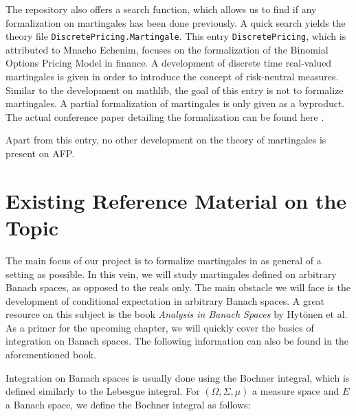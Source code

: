 The repository also offers a search function, which allows us to find if any formalization on martingales has been done previously. A quick search yields the theory file \lstinline{DiscretePricing.Martingale}. This entry \lstinline{DiscretePricing}, which is attributed to Mnacho Echenim, focuses on the formalization of the Binomial Options Pricing Model in finance. A development of discrete time real-valued martingales is given in order to introduce the concept of risk-neutral measures. Similar to the development on \textsf{mathlib}, the goal of this entry is not to formalize martingales. A partial formalization of martingales is only given as a byproduct. The actual conference paper detailing the formalization can be found here \cite{EchenimPeltier}.

Apart from this entry, no other development on the theory of martingales is present on \textsf{\ac{AFP}}.
\pagebreak

\section{Existing Reference Material on the Topic}

The main focus of our project is to formalize martingales in as general of a setting as possible. In this vein, we will study martingales defined on arbitrary Banach spaces, as opposed to the reals only. The main obstacle we will face is the development of conditional expectation in arbitrary Banach spaces. A great resource on this subject is the book \textit{Analysis in Banach Spaces} \cite{Hytoenen_2016} by Hytönen et al. As a primer for the upcoming chapter, we will quickly cover the basics of integration on Banach spaces. The following information can also be found in the aforementioned book.

Integration on Banach spaces is usually done using the Bochner integral, which is defined similarly to the Lebesgue integral. For $(\Omega, \Sigma, \mu)$ a measure space and $E$ a Banach space, we define the Bochner integral as follows:

